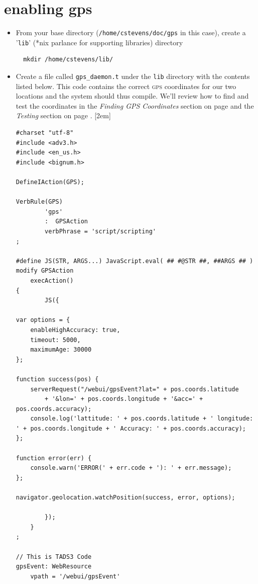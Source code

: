 \section{enabling gps}
\begin{itemize}[leftmargin=0em]
\item From your base directory (\texttt{\scriptsize{/home/cstevens/doc/gps}} in this case), create a '\texttt{lib}'
(*nix parlance for supporting libraries) directory
\begin{lstlisting}
  mkdir /home/cstevens/lib/
\end{lstlisting}
\item Create a file called \texttt{\scriptsize{gps\_daemon.t}} under the \texttt{lib} directory with the contents listed below. This code contains the correct
  \textsc{gps} coordinates for our two locations and the system should thus
  compile. We'll review how to find and test the coordinates in the
  \emph{Finding GPS Coordinates} section on page \pageref{sec:coordinates} and
  the \emph{Testing} section on page \pageref{sec:testing}.
  [2em]
\begin{lstlisting}
#charset "utf-8"
#include <adv3.h>
#include <en_us.h>
#include <bignum.h>

DefineIAction(GPS);

VerbRule(GPS)
        'gps'
        :  GPSAction
        verbPhrase = 'script/scripting'
;

#define JS(STR, ARGS...) JavaScript.eval( ## #@STR ##, ##ARGS ## )
modify GPSAction
    execAction()
{
        JS({

var options = {
    enableHighAccuracy: true,
    timeout: 5000,
    maximumAge: 30000 
};

function success(pos) {
    serverRequest("/webui/gpsEvent?lat=" + pos.coords.latitude
        + '&lon=' + pos.coords.longitude + '&acc=' + pos.coords.accuracy);
    console.log('lattitude: ' + pos.coords.latitude + ' longitude: ' + pos.coords.longitude + ' Accuracy: ' + pos.coords.accuracy);
};

function error(err) {
    console.warn('ERROR(' + err.code + '): ' + err.message);
};

navigator.geolocation.watchPosition(success, error, options);

        });
    }
;

// This is TADS3 Code
gpsEvent: WebResource
    vpath = '/webui/gpsEvent'


\end{lstlisting}
\end{itemize}
